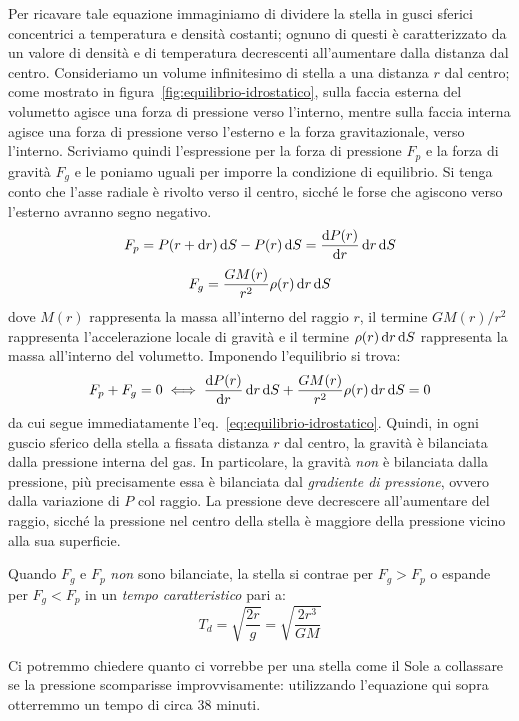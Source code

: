 Per ricavare tale equazione immaginiamo di dividere la stella in gusci sferici concentrici a temperatura e densità costanti; ognuno di questi è caratterizzato da un valore di densità e di temperatura decrescenti all'aumentare dalla distanza dal centro. Consideriamo un volume infinitesimo di stella a una distanza $r$ dal centro; come mostrato in figura~\ref{fig:equilibrio-idrostatico}, sulla faccia esterna del volumetto agisce una forza di pressione verso l'interno, mentre sulla faccia interna agisce una forza di pressione verso l'esterno e la forza gravitazionale, verso l'interno. Scriviamo quindi l'espressione per la forza di pressione $F_p$ e la forza di gravità $F_g$ e le poniamo uguali per imporre la condizione di equilibrio. Si tenga conto che l'asse radiale è rivolto verso il centro, sicché le forse che agiscono verso l'esterno avranno segno negativo.
\[
    F_p = P(r+\mathop{\mathrm{{}d}}\mathopen{} r) \mathop{\mathrm{{}d}}\mathopen{} S - P(r) \mathop{\mathrm{{}d}}\mathopen{} S = \frac{\mathop{\mathrm{{}d}}\mathopen{} P(r)}{\mathop{\mathrm{{}d}}\mathopen{} r} \mathop{\mathrm{{}d}}\mathopen{} r \mathop{\mathrm{{}d}}\mathopen{} S
\]
\[
    F_g = \frac{GM(r)}{r^2} \rho(r) \mathop{\mathrm{{}d}}\mathopen{} r \mathop{\mathrm{{}d}}\mathopen{} S
\]
dove $M(r)$ rappresenta la massa all'interno del raggio $r$, il termine $GM(r) / r^2$ rappresenta l'accelerazione locale di gravità e il termine $\rho(r) \mathop{\mathrm{{}d}}\mathopen{} r \mathop{\mathrm{{}d}}\mathopen{} S$ rappresenta la massa all'interno del volumetto. Imponendo l'equilibrio si trova:
\[
    F_p + F_g = 0 \iff \frac{\mathop{\mathrm{{}d}}\mathopen{} P(r)}{\mathop{\mathrm{{}d}}\mathopen{} r} \mathop{\mathrm{{}d}}\mathopen{} r \mathop{\mathrm{{}d}}\mathopen{} S+ \frac{GM(r)}{r^2} \rho(r) \mathop{\mathrm{{}d}}\mathopen{} r \mathop{\mathrm{{}d}}\mathopen{} S = 0
\]
da cui segue immediatamente l'eq.~\eqref{eq:equilibrio-idrostatico}. Quindi, in ogni guscio sferico della stella a fissata distanza $r$ dal centro, la gravità è bilanciata dalla pressione interna del gas. In particolare, la gravità \emph{non} è bilanciata dalla pressione, più precisamente essa è bilanciata dal \emph{gradiente di pressione}, ovvero dalla variazione di $P$ col raggio. La pressione deve decrescere all'aumentare del raggio, sicché la pressione nel centro della stella è maggiore della pressione vicino alla sua superficie. 

Quando $F_g$ e $F_p$ \emph{non} sono bilanciate, la stella si contrae per $F_g > F_p$ o espande per $F_g < F_p$ in un \emph{tempo caratteristico} pari a:
\[
    T_d = \sqrt{\frac{2r}{g}} = \sqrt{\frac{2r^3}{GM}}
\]

Ci potremmo chiedere quanto ci vorrebbe per una stella come il Sole a collassare se la pressione scomparisse improvvisamente: utilizzando l'equazione qui sopra otterremmo un tempo di circa 38 minuti.